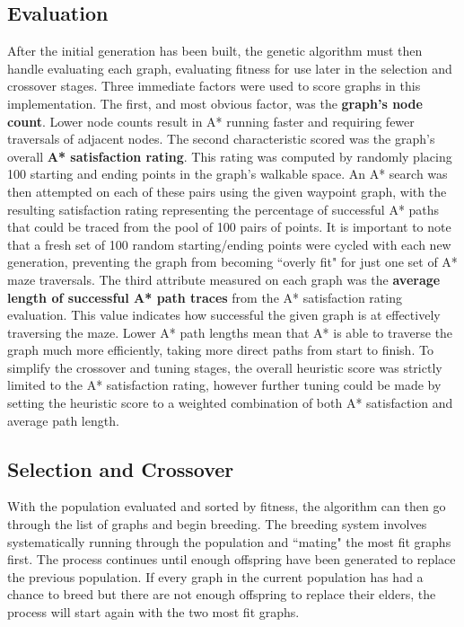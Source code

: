 	\subsection{Evaluation}
	After the initial generation has been built, the genetic algorithm must then handle evaluating each graph, evaluating fitness for use later in the selection and crossover stages. Three immediate factors were used to score graphs in this implementation. The first, and most obvious factor, was the \textbf{graph's node count}. Lower node counts result in A* running faster and requiring fewer traversals of adjacent nodes. The second characteristic scored was the graph's overall \textbf{A* satisfaction rating}. This rating was computed by randomly placing 100 starting and ending points in the graph's walkable space. An A* search was then attempted on each of these pairs using the given waypoint graph, with the resulting satisfaction rating representing the percentage of successful A* paths that could be traced from the pool of 100 pairs of points. It is important to note that a fresh set of 100 random starting/ending points were cycled with each new generation, preventing the graph from becoming ``overly fit" for just one set of A* maze traversals. The third attribute measured on each graph was the \textbf{average length of successful A* path traces} from the A* satisfaction rating evaluation. This value indicates how successful the given graph is at effectively traversing the maze. Lower A* path lengths mean that A* is able to traverse the graph much more efficiently, taking more direct paths from start to finish. To simplify the crossover and tuning stages, the overall heuristic score was strictly limited to the A* satisfaction rating, however further tuning could be made by setting the heuristic score to a weighted combination of both A* satisfaction and average path length.
	
	\subsection{Selection and Crossover}
	With the population evaluated and sorted by fitness, the algorithm can then go through the list of graphs and begin breeding. The breeding system involves systematically running through the population and ``mating" the most fit graphs first. The process continues until enough offspring have been generated to replace the previous population. If every graph in the current population has had a chance to breed but there are not enough offspring to replace their elders, the process will start again with the two most fit graphs.
	

